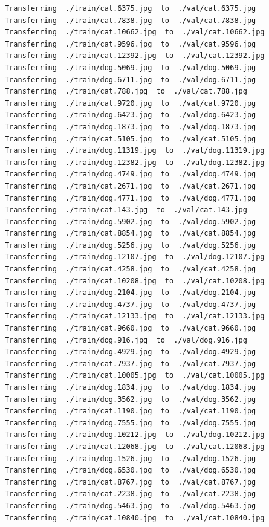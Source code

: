 \documentclass[]{book}
\theoremstyle{definition}
\theoremstyle{definition}
\theoremstyle{definition}
\theoremstyle{remark}
\begin{document}
\begin{verbatim}
Transferring  ./train/cat.6375.jpg  to  ./val/cat.6375.jpg
Transferring  ./train/cat.7838.jpg  to  ./val/cat.7838.jpg
Transferring  ./train/cat.10662.jpg  to  ./val/cat.10662.jpg
Transferring  ./train/cat.9596.jpg  to  ./val/cat.9596.jpg
Transferring  ./train/cat.12392.jpg  to  ./val/cat.12392.jpg
Transferring  ./train/dog.5069.jpg  to  ./val/dog.5069.jpg
Transferring  ./train/dog.6711.jpg  to  ./val/dog.6711.jpg
Transferring  ./train/cat.788.jpg  to  ./val/cat.788.jpg
Transferring  ./train/cat.9720.jpg  to  ./val/cat.9720.jpg
Transferring  ./train/dog.6423.jpg  to  ./val/dog.6423.jpg
Transferring  ./train/dog.1873.jpg  to  ./val/dog.1873.jpg
Transferring  ./train/cat.5105.jpg  to  ./val/cat.5105.jpg
Transferring  ./train/dog.11319.jpg  to  ./val/dog.11319.jpg
Transferring  ./train/dog.12382.jpg  to  ./val/dog.12382.jpg
Transferring  ./train/dog.4749.jpg  to  ./val/dog.4749.jpg
Transferring  ./train/cat.2671.jpg  to  ./val/cat.2671.jpg
Transferring  ./train/dog.4771.jpg  to  ./val/dog.4771.jpg
Transferring  ./train/cat.143.jpg  to  ./val/cat.143.jpg
Transferring  ./train/dog.5902.jpg  to  ./val/dog.5902.jpg
Transferring  ./train/cat.8854.jpg  to  ./val/cat.8854.jpg
Transferring  ./train/dog.5256.jpg  to  ./val/dog.5256.jpg
Transferring  ./train/dog.12107.jpg  to  ./val/dog.12107.jpg
Transferring  ./train/cat.4258.jpg  to  ./val/cat.4258.jpg
Transferring  ./train/cat.10208.jpg  to  ./val/cat.10208.jpg
Transferring  ./train/dog.2104.jpg  to  ./val/dog.2104.jpg
Transferring  ./train/dog.4737.jpg  to  ./val/dog.4737.jpg
Transferring  ./train/cat.12133.jpg  to  ./val/cat.12133.jpg
Transferring  ./train/cat.9660.jpg  to  ./val/cat.9660.jpg
Transferring  ./train/dog.916.jpg  to  ./val/dog.916.jpg
Transferring  ./train/dog.4929.jpg  to  ./val/dog.4929.jpg
Transferring  ./train/cat.7937.jpg  to  ./val/cat.7937.jpg
Transferring  ./train/cat.10005.jpg  to  ./val/cat.10005.jpg
Transferring  ./train/dog.1834.jpg  to  ./val/dog.1834.jpg
Transferring  ./train/dog.3562.jpg  to  ./val/dog.3562.jpg
Transferring  ./train/cat.1190.jpg  to  ./val/cat.1190.jpg
Transferring  ./train/dog.7555.jpg  to  ./val/dog.7555.jpg
Transferring  ./train/dog.10212.jpg  to  ./val/dog.10212.jpg
Transferring  ./train/cat.12068.jpg  to  ./val/cat.12068.jpg
Transferring  ./train/dog.1526.jpg  to  ./val/dog.1526.jpg
Transferring  ./train/dog.6530.jpg  to  ./val/dog.6530.jpg
Transferring  ./train/cat.8767.jpg  to  ./val/cat.8767.jpg
Transferring  ./train/cat.2238.jpg  to  ./val/cat.2238.jpg
Transferring  ./train/dog.5463.jpg  to  ./val/dog.5463.jpg
Transferring  ./train/cat.10840.jpg  to  ./val/cat.10840.jpg

\end{verbatim}
\end{document}
